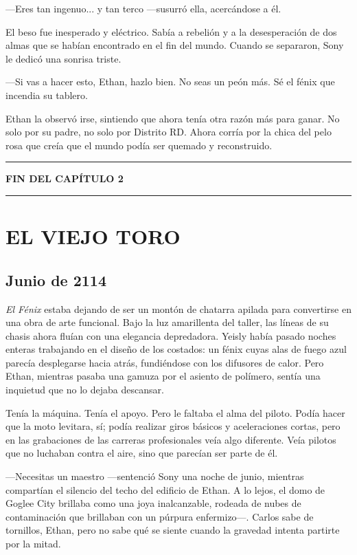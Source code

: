 \documentclass[12pt,a4paper]{book}
\begin{document}
---Eres tan ingenuo... y tan terco ---susurró ella, acercándose a él.

El beso fue inesperado y eléctrico. Sabía a rebelión y a la desesperación de dos almas que se habían encontrado en el fin del mundo. Cuando se separaron, Sony le dedicó una sonrisa triste.

---Si vas a hacer esto, Ethan, hazlo bien. No seas un peón más. Sé el fénix que incendia su tablero.

Ethan la observó irse, sintiendo que ahora tenía otra razón más para ganar. No solo por su padre, no solo por Distrito RD. Ahora corría por la chica del pelo rosa que creía que el mundo podía ser quemado y reconstruido.

\bigskip
\noindent\rule{\textwidth}{0.4pt}
\bigskip

\textbf{FIN DEL CAPÍTULO 2}


\bigskip
\noindent\rule{\textwidth}{0.4pt}
\bigskip

\chapter{EL VIEJO TORO}

\section*{Junio de 2114}

\textit{El Fénix} estaba dejando de ser un montón de chatarra apilada para convertirse en una obra de arte funcional. Bajo la luz amarillenta del taller, las líneas de su chasis ahora fluían con una elegancia depredadora. Yeisly había pasado noches enteras trabajando en el diseño de los costados: un fénix cuyas alas de fuego azul parecía desplegarse hacia atrás, fundiéndose con los difusores de calor. Pero Ethan, mientras pasaba una gamuza por el asiento de polímero, sentía una inquietud que no lo dejaba descansar.

Tenía la máquina. Tenía el apoyo. Pero le faltaba el alma del piloto. Podía hacer que la moto levitara, sí; podía realizar giros básicos y aceleraciones cortas, pero en las grabaciones de las carreras profesionales veía algo diferente. Veía pilotos que no luchaban contra el aire, sino que parecían ser parte de él.

---Necesitas un maestro ---sentenció Sony una noche de junio, mientras compartían el silencio del techo del edificio de Ethan. A lo lejos, el domo de Goglee City brillaba como una joya inalcanzable, rodeada de nubes de contaminación que brillaban con un púrpura enfermizo---. Carlos sabe de tornillos, Ethan, pero no sabe qué se siente cuando la gravedad intenta partirte por la mitad.
\end{document}
